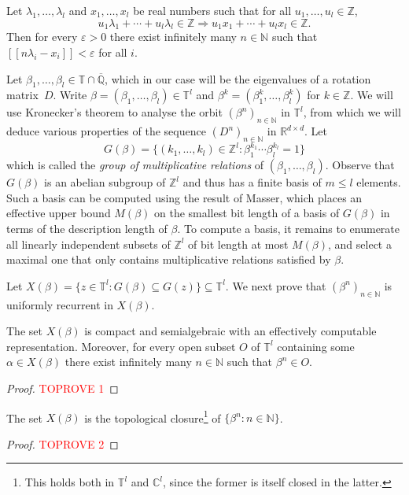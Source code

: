\documentclass[a4paper,UKenglish,cleveref]{lipics-v2021}
\newcommand{\torus}{\mathbb{T}}
\newcommand{\nat}{\mathbb{N}}
\newcommand{\intg}{\mathbb{Z}}
\newcommand{\rel}{\mathbb{R}}
\newcommand{\rat}{\mathbb{Q}}
\newcommand{\com}{\mathbb{C}}
\newcommand{\alg}{\overline{\rat}}
\newcommand{\seq}[1]{(#1)_{n \in \mathbb{N}}}
\begin{document}
\begin{theorem}
	\label{thm:kronecker-classical}
	Let $\lambda_1,\ldots,\lambda_l$ and $x_1,\ldots,x_l$ be real numbers such that for all $u_1,\ldots,u_l \in \intg$,
	\[
	u_1 \lambda_1 + \cdots + u_l \lambda_l \in \intg \Rightarrow u_1x_1 + \cdots + u_lx_l \in \intg.
	\]
	Then for every $\varepsilon > 0$ there exist infinitely many $n \in \nat$ such that $[\![ n \lambda_i - x_i ]\!] < \varepsilon$ for all $i$.
\end{theorem}


Let $\beta_1,\ldots,\beta_l \in \torus \cap \alg$, which in our case will be the eigenvalues of a rotation matrix~$D$.
Write $\beta = (\beta_1,\ldots,\beta_l) \in \torus^l$ and $\beta^k = (\beta_1^k,\ldots,\beta_l^k)$ for $k \in \intg$.
We will use Kronecker's theorem to analyse the orbit $\seq{\beta^n}$ in $\torus^l$, from which we will deduce various properties of the sequence $(D^n)_{n\in\nat}$ in $\rel^{d\times d}$.
Let
\[
G(\beta) = \{(k_1,\ldots,k_l) \in \intg^l \colon \beta_1^{k_1}\cdots \beta_l^{k_l} = 1\}
\]
which is called the \emph{group of multiplicative relations} of $(\beta_1,\ldots,\beta_l)$.
Observe that $G(\beta)$ is an abelian subgroup of $\intg^l$ and thus has a finite basis of $m \le l$ elements.
Such a basis can be computed using the result \cite{masse-mult-rel-bound} of Masser, which places an effective upper bound $M(\beta)$ on the smallest bit length of a basis of $G(\beta)$ in terms of the description length of $\beta$.
To compute a basis, it remains to enumerate all linearly independent subsets of $\intg^l$ of bit length at most $M(\beta)$, and select a maximal one that only contains multiplicative relations satisfied by $\beta$.


Let $X(\beta) = \{z \in \torus^l \colon G(\beta) \subseteq G(z)\} \subseteq \torus^l$. 
We next prove that $(\beta^n)_{n\in\nat}$ is uniformly recurrent in $X(\beta)$.

\begin{lemma}
	\label{thm:kronecker-uniform-recurrence}
	The set $X(\beta)$ is compact and semialgebraic with an effectively computable representation.
	Moreover, for every open subset $O$ of $\torus^l$ containing some $\alpha \in X(\beta)$ there exist infinitely many $n \in \nat$ such that $\beta^n \in O$.
\end{lemma}
\begin{proof}\textcolor{red}{TOPROVE 1}\end{proof}
\begin{corollary}
	\label{thm:kronecker-closure}
	The set $X(\beta)$ is the topological closure\footnote{This holds both in $\torus^l$ and $\com^l$, since the former is itself closed in the latter.} of 
$\{\beta^n \colon n\in\nat\}$.
\end{corollary}
\begin{proof}\textcolor{red}{TOPROVE 2}\end{proof}
\end{document}
